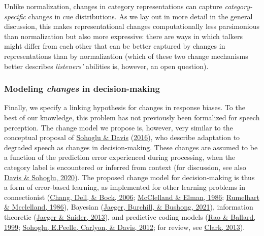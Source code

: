 \documentclass[
  11pt,
  english,
  man,floatsintext]{apa6}
\begin{document}
Unlike normalization, changes in category representations can capture \emph{category-specific} changes in cue distributions. As we lay out in more detail in the general discussion, this makes representational changes computationally less parsimonious than normalization but also more expressive: there are ways in which talkers might differ from each other that can be better captured by changes in representations than by normalization (which of these two change mechanisms better describes \emph{listeners'} abilities is, however, an open question).

\hypertarget{sec:change-bias}{%
\subsubsection{\texorpdfstring{Modeling \emph{changes} in decision-making}{Modeling changes in decision-making}}\label{sec:change-bias}}

Finally, we specify a linking hypothesis for changes in response biases. To the best of our knowledge, this problem has not previously been formalized for speech perception. The change model we propose is, however, very similar to the conceptual proposal of \protect\hyperlink{ref-sohoglu-davis2016}{Sohoglu \& Davis} (\protect\hyperlink{ref-sohoglu-davis2016}{2016}), who describe adaptation to degraded speech as changes in decision-making. These changes are assumed to be a function of the prediction error experienced during processing, when the category label is encountered or inferred from context (for discussion, see also \protect\hyperlink{ref-davis-sohoglu2020}{Davis \& Sohoglu, 2020}). The proposed change model for decision-making is thus a form of error-based learning, as implemented for other learning problems in connectionist (\protect\hyperlink{ref-chang2006}{Chang, Dell, \& Bock, 2006}; \protect\hyperlink{ref-mcclelland-elman1986}{McClelland \& Elman, 1986}; \protect\hyperlink{ref-rumelhart-mcclelland1986}{Rumelhart \& Mcclelland, 1986}), Bayesian (\protect\hyperlink{ref-jaeger2019}{Jaeger, Burchill, \& Bushong, 2021}), information theoretic (\protect\hyperlink{ref-jaeger-snider2013}{Jaeger \& Snider, 2013}), and predictive coding models (\protect\hyperlink{ref-rao-ballard1999}{Rao \& Ballard, 1999}; \protect\hyperlink{ref-sohoglu2012}{Sohoglu, E.Peelle, Carlyon, \& Davis, 2012}; for review, see \protect\hyperlink{ref-clark2013}{Clark, 2013}).
\end{document}
